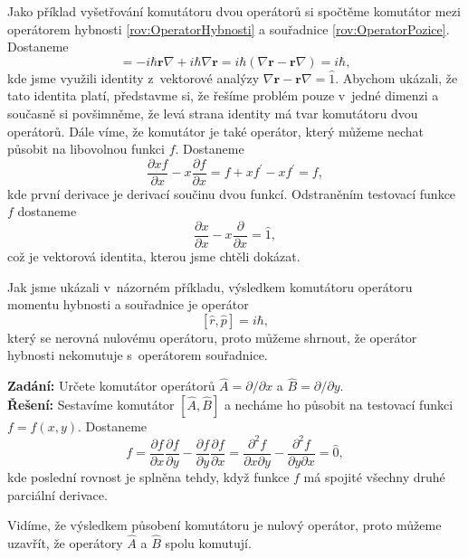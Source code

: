 Jako příklad vyšetřování komutátoru dvou operátorů si spočtěme komutátor mezi operátorem hybnosti \eqref{rov:OperatorHybnosti} a souřadnice \eqref{rov:OperatorPozice}. Dostaneme
\begin{equation}
[\hat{r},\hat{p}] = -i \hbar \mathbf{r} \nabla + i \hbar \nabla \mathbf{r} = i \hbar (\nabla \mathbf{r} - \mathbf{r} \nabla) = i \hbar,
\nonumber
\end{equation}
kde jsme využili identity z~vektorové analýzy $\nabla \mathbf{r} - \mathbf{r} \nabla = \hat{1}$. Abychom ukázali, že tato identita platí, představme si, že řešíme problém pouze v~jedné dimenzi a současně si povšimněme, že levá strana identity má tvar komutátoru dvou operátorů. Dále víme, že komutátor je také operátor, který můžeme nechat působit na libovolnou funkci $f$. Dostaneme
\begin{equation}
\frac{\partial x f}{\partial x} - x\frac{\partial f}{\partial x} = f + xf^{\prime} - xf^{\prime} = f,
\nonumber
\end{equation}
kde první derivace je derivací součinu dvou funkcí. Odstraněním testovací funkce $f$ dostaneme
\begin{equation}
\frac{\partial x }{\partial x} - x\frac{\partial }{\partial x} = \hat{1},
\nonumber
\end{equation}
což je vektorová identita, kterou jsme chtěli dokázat.

Jak jsme ukázali v~názorném příkladu, výsledkem komutátoru operátoru momentu hybnosti a souřadnice je operátor
\begin{equation}
\boxed{[\hat{r},\hat{p}] = i \hbar,}
\label{rov:KomutatorHybnostSouradnice}
\end{equation}
který se nerovná nulovému operátoru, proto můžeme shrnout, že operátor hybnosti nekomutuje s~operátorem souřadnice.

\begin{priklad} \label{pr:Komutator}
\textbf{Zadání:} Určete komutátor operátorů $\hat{A} = \partial/\partial x$ a $\hat{B} = \partial / \partial y$. \\
\textbf{Řešení:} Sestavíme komutátor $[\hat{A},\hat{B}]$ a necháme ho působit na testovací funkci $f=f(x,y)$. Dostaneme
\begin{displaymath}
[\hat{A},\hat{B}] f = \frac{\partial f}{\partial x} \frac{\partial f}{\partial y} - \frac{\partial f}{\partial y} \frac{\partial f}{\partial x} = \frac{\partial^2 f}{\partial x \partial y} - \frac{\partial^2 f}{\partial y \partial x} = \hat{0},
\end{displaymath}
kde poslední rovnost je splněna tehdy, když funkce $f$ má spojité všechny druhé parciální derivace.

Vidíme, že výsledkem působení komutátoru je nulový operátor, proto můžeme uzavřít, že operátory $\hat{A}$ a $\hat{B}$ spolu komutují.
\end{priklad}

